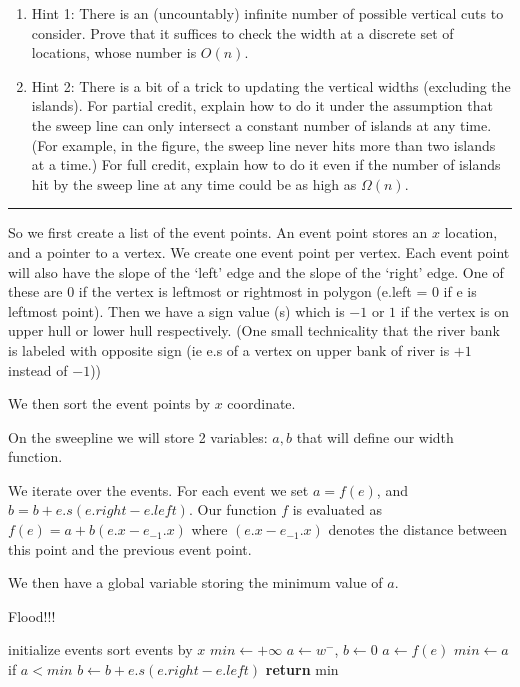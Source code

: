 \documentclass[11pt]{article}
\begin{document}
\begin{enumerate}

    \item Hint 1: There is an (uncountably) infinite number of possible vertical
        cuts to consider. Prove that it suffices to check the width at a
        discrete set of locations, whose number is $O(n)$.

    \item Hint 2: There is a bit of a trick to updating the vertical widths
        (excluding the islands). For partial credit, explain how to do it under
        the assumption that the sweep line can only intersect a constant number
        of islands at any time. (For example, in the figure, the sweep line
        never hits more than two islands at a time.) For full credit, explain
        how to do it even if the number of islands hit by the sweep line at any
        time could be as high as $\Omega(n)$.
\end{enumerate}
\hrule


So we first create a list of the event points. An event point stores an $x$ location,
and a pointer to a vertex. We create one event point per vertex. 
Each event point will also have the slope of the `left' edge
and the slope of the `right' edge.
One of these are 0 if the vertex is leftmost or rightmost in polygon (e.left = 0 if e is leftmost point).
Then we have a sign value (s) which is $-1$ or $1$ if the vertex is on upper hull or lower hull respectively.
(One small technicality that the river bank is labeled with opposite sign (ie e.s of a vertex on upper bank of river is $+1$ instead of $-1$))


We then sort the event points by $x$ coordinate. 

On the sweepline we will store 2 variables: $a, b$ that will define our width function. 

We iterate over the events. For each event we set $a = f(e)$, and $b = b + e.s (e.right - e.left)$.
Our function $f$ is evaluated as $f(e) = a + b (e.x - e_{-1}.x)$ where 
$(e.x - e_{-1}.x)$ denotes the distance between this point and the previous event point.

We then have a global variable storing the minimum value of $a$.

\begin{algorithm}
    \caption{Flood!!!}
    \label{alg:neighbors}
    \begin{algorithmic}[1]
        \State initialize events
        \State sort events by $x$
        \State $min \gets +\infty$
        \State $a \gets w^-$, $b \gets 0$
            \State $a \gets f(e)$
            \State $min \gets a$ if $a < min$
            \State $b \gets b + e.s (e.right - e.left)$
        \EndFor
        \State \textbf{return} min
    \EndFunction
    \end{algorithmic}
\end{algorithm}
\end{document}
